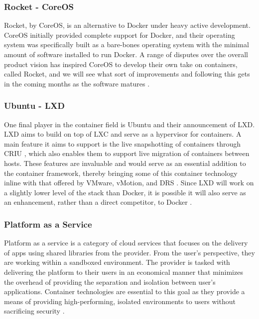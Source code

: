 \subsubsection{Rocket - CoreOS}
Rocket, by CoreOS, is an alternative to Docker under heavy active development. CoreOS initially provided complete support for Docker, and their operating system was specifically built as a bare-bones operating system with the minimal amount of software installed to run Docker. A range of disputes over the overall product vision has inspired CoreOS to develop their own take on containers, called Rocket, and we will see what sort of improvements and following this gets in the coming months as the software matures \cite{rocket}.

\subsubsection{Ubuntu - LXD}
One final player in the container field is Ubuntu and their announcement of LXD. LXD aims to build on top of LXC and serve as a hypervisor for containers. A main feature it aims to support is the live snapshotting of containers through CRIU \cite{CRIU}, which also enables them to support live migration of containers between hosts. These features are invaluable and would serve as an essential addition to the container framework, thereby bringing some of this container technology inline with that offered by VMware, vMotion, and DRS \cite{vmotion,DRS}. Since LXD will work on a slightly lower level of the stack than Docker, it is possible it will also serve as an enhancement, rather than a direct competitor, to Docker \cite{lxd}.

\subsubsection{Platform as a Service}
Platform as a service is a category of cloud services that focuses on the delivery of apps using shared libraries from the provider. From the user's perspective, they are working within a sandboxed environment. The provider is tasked with delivering the platform to their users in an economical manner that minimizes the overhead of providing the separation and isolation between user's applications. Container technologies are essential to this goal as they provide a means of providing high-performing, isolated environments to users without sacrificing security \cite{paas}.



